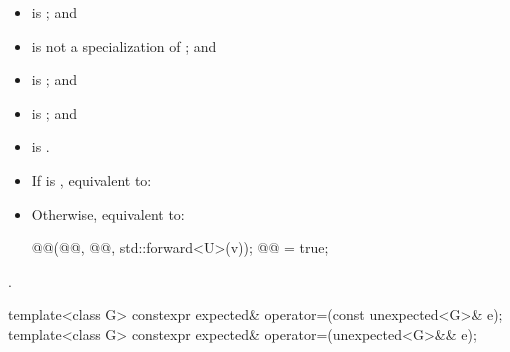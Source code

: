 \begin{itemdescr}
\pnum
\constraints
\begin{itemize}
\item
{} is ; and
\item
{} is not a specialization of ; and
\item
{} is ; and
\item
{} is ; and
\item
{}
is .
\end{itemize}

\pnum
\effects
\begin{itemize}
\item
If  is ,
equivalent to: 
\item
Otherwise, equivalent to:
\begin{codeblock}
@@(@@, @@, std::forward<U>(v));
@@ = true;
\end{codeblock}
\end{itemize}

\pnum
\returns
{}.
\end{itemdescr}

%
\begin{itemdecl}
template<class G>
  constexpr expected& operator=(const unexpected<G>& e);
template<class G>
  constexpr expected& operator=(unexpected<G>&& e);
\end{itemdecl}

